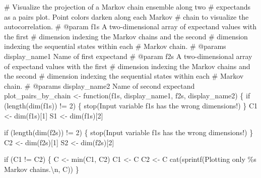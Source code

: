 \documentclass[
  letterpaper,
  DIV=11,
  numbers=noendperiod]{scrartcl}
\newenvironment{Shaded}{\begin{snugshade}}{\end{snugshade}}
\newcommand{\BuiltInTok}[1]{\textcolor[rgb]{0.00,0.23,0.31}{#1}}
\newcommand{\CharTok}[1]{\textcolor[rgb]{0.13,0.47,0.30}{#1}}
\newcommand{\CommentTok}[1]{\textcolor[rgb]{0.37,0.37,0.37}{#1}}
\newcommand{\ControlFlowTok}[1]{\textcolor[rgb]{0.00,0.23,0.31}{#1}}
\newcommand{\DecValTok}[1]{\textcolor[rgb]{0.68,0.00,0.00}{#1}}
\newcommand{\NormalTok}[1]{\textcolor[rgb]{0.00,0.23,0.31}{#1}}
\newcommand{\OperatorTok}[1]{\textcolor[rgb]{0.37,0.37,0.37}{#1}}
\newcommand{\SpecialCharTok}[1]{\textcolor[rgb]{0.37,0.37,0.37}{#1}}
\newcommand{\StringTok}[1]{\textcolor[rgb]{0.13,0.47,0.30}{#1}}
\begin{document}
\begin{Shaded}
\begin{Highlighting}[]
\CommentTok{\# Visualize the projection of a Markov chain ensemble along two }
\CommentTok{\# expectands as a pairs plot.  Point colors darken along each Markov }
\CommentTok{\# chain to visualize the autocorrelation.}
\CommentTok{\# @param f1s A two{-}dimensional array of expectand values with the first }
\CommentTok{\#            dimension indexing the Markov chains and the second }
\CommentTok{\#            dimension indexing the sequential states  within each }
\CommentTok{\#            Markov chain.}
\CommentTok{\# @params display\_name1 Name of first expectand}
\CommentTok{\# @param f2s A two{-}dimensional array of expectand values with the first }
\CommentTok{\#            dimension indexing the Markov chains and the second }
\CommentTok{\#            dimension indexing the sequential states  within each }
\CommentTok{\#            Markov chain.}
\CommentTok{\# @params display\_name2 Name of second expectand}
\NormalTok{plot\_pairs\_by\_chain }\OperatorTok{\textless{}{-}}\NormalTok{ function(f1s, display\_name1,}
\NormalTok{                                f2s, display\_name2) \{}
  \ControlFlowTok{if}\NormalTok{ (length(dim(f1s)) }\OperatorTok{!=} \DecValTok{2}\NormalTok{) \{}
\NormalTok{    stop(}\StringTok{\textquotesingle{}Input variable \textasciigrave{}f1s\textasciigrave{} has the wrong dimensions!\textquotesingle{}}\NormalTok{)}
\NormalTok{  \}}
\NormalTok{  C1 }\OperatorTok{\textless{}{-}}\NormalTok{ dim(f1s)[}\DecValTok{1}\NormalTok{]}
\NormalTok{  S1 }\OperatorTok{\textless{}{-}}\NormalTok{ dim(f1s)[}\DecValTok{2}\NormalTok{]}

  \ControlFlowTok{if}\NormalTok{ (length(dim(f2s)) }\OperatorTok{!=} \DecValTok{2}\NormalTok{) \{}
\NormalTok{    stop(}\StringTok{\textquotesingle{}Input variable \textasciigrave{}f1s\textasciigrave{} has the wrong dimensions!\textquotesingle{}}\NormalTok{)}
\NormalTok{  \}}
\NormalTok{  C2 }\OperatorTok{\textless{}{-}}\NormalTok{ dim(f2s)[}\DecValTok{1}\NormalTok{]}
\NormalTok{  S2 }\OperatorTok{\textless{}{-}}\NormalTok{ dim(f2s)[}\DecValTok{2}\NormalTok{]}
  
  \ControlFlowTok{if}\NormalTok{ (C1 }\OperatorTok{!=}\NormalTok{ C2) \{}
\NormalTok{    C }\OperatorTok{\textless{}{-}} \BuiltInTok{min}\NormalTok{(C1, C2)}
\NormalTok{    C1 }\OperatorTok{\textless{}{-}}\NormalTok{ C}
\NormalTok{    C2 }\OperatorTok{\textless{}{-}}\NormalTok{ C}
\NormalTok{    cat(sprintf(}\StringTok{\textquotesingle{}Plotting only }\SpecialCharTok{\%s}\StringTok{ Markov chains.}\CharTok{\textbackslash{}n}\StringTok{\textquotesingle{}}\NormalTok{, C))}
\NormalTok{  \}}


\end{Highlighting}
\end{Shaded}
\end{document}
